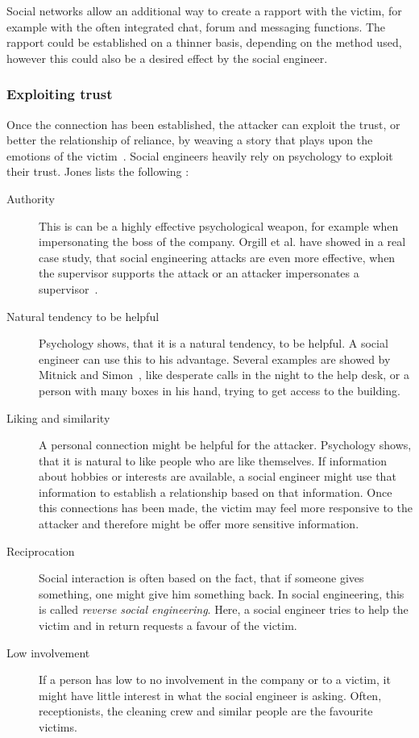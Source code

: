 Social networks allow an additional way to create a rapport with the victim,
for example with the often integrated chat, forum and messaging functions. The
rapport could be established on a thinner basis, depending on the method used,
however this could also be a desired effect by the social engineer.


\subsubsection{Exploiting trust}

Once the connection has been established, the attacker can exploit the trust,
or better the relationship of reliance, by \glqq{}weaving a story that plays
upon the emotions of the victim\grqq{}~\cite{thornburgh2004}. Social engineers
heavily rely on psychology to exploit their trust. Jones lists the following
\cite{jones2004}:

\begin{description}

\item[Authority] This is can be a highly effective psychological weapon, for
  example when impersonating the boss of the company. Orgill et al. have
  showed in a real case study, that social engineering attacks are even more
  effective, when the supervisor supports the attack or an attacker
  impersonates a supervisor~\cite{orgill2004}.
\item[Natural tendency to be helpful] Psychology shows, that it is a natural
  tendency, to be helpful. A social engineer can use this to his advantage.
  Several examples are showed by Mitnick and Simon~\cite{mitnick2003}, like
  desperate calls in the night to the help desk, or a person with many boxes
  in his hand, trying to get access to the building.
\item[Liking and similarity] A personal connection might be helpful for the
  attacker. Psychology shows, that it is natural to like people who are like
  themselves. If information about hobbies or interests are available, a social
  engineer might use that information to establish a relationship based on that
  information. Once this connections has been made, the victim may feel more
  responsive to the attacker and therefore might be offer more sensitive
  information.
\item[Reciprocation] Social interaction is often based on the fact, that if
  someone gives something, one might give him something back. In social
  engineering, this is called \textit{reverse social engineering}. Here, a
  social engineer tries to help the victim and in return requests a favour of
  the victim.
\item[Low involvement] If a person has low to no involvement in the company or
  to a victim, it might have little interest in what the social engineer is
  asking. Often, receptionists, the cleaning crew and similar people are the
  favourite victims.
\end{description}

